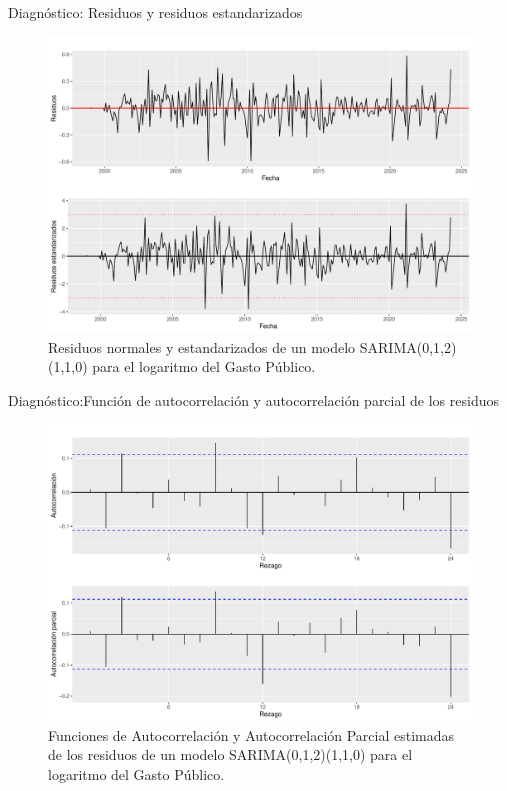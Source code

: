 \documentclass[
  ignorenonframetext,
]{beamer}
\begin{document}
\begin{frame}{Diagnóstico: Residuos y residuos estandarizados}
\protect\hypertarget{diagnuxf3stico-residuos-y-residuos-estandarizados}{}
\begin{figure}[H]

{\centering \includegraphics[width=0.75\linewidth]{presentacion_files/figure-beamer/unnamed-chunk-6-1} 

}

\caption{\label{residuos3} Residuos normales y estandarizados de un modelo SARIMA(0,1,2)(1,1,0) para el logaritmo del Gasto Público.}\label{fig:unnamed-chunk-6}
\end{figure}
\end{frame}

\begin{frame}{Diagnóstico:Función de autocorrelación y autocorrelación
parcial de los residuos}
\protect\hypertarget{diagnuxf3sticofunciuxf3n-de-autocorrelaciuxf3n-y-autocorrelaciuxf3n-parcial-de-los-residuos}{}
\begin{figure}[H]

{\centering \includegraphics[width=0.75\linewidth]{presentacion_files/figure-beamer/unnamed-chunk-8-1} 

}

\caption{\label{facyp_r3} Funciones de Autocorrelación y Autocorrelación Parcial estimadas de los residuos de un modelo SARIMA(0,1,2)(1,1,0) para el logaritmo del Gasto Público.}\label{fig:unnamed-chunk-8}
\end{figure}
\end{frame}
\end{document}
